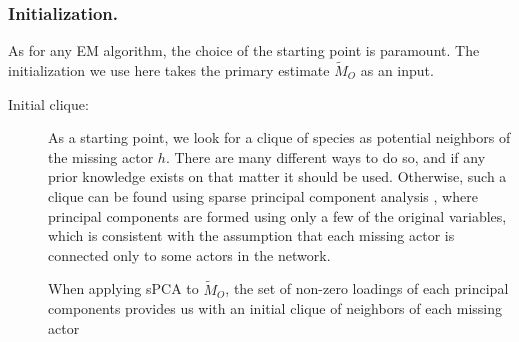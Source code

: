 \subsubsection*{Initialization.}
\label{init}
As for any EM algorithm, the choice of the starting point is paramount. The initialization we use here takes the primary estimate $\widetilde{M}_O$ as an input.
\begin{description}
\item [Initial clique:]
As a starting point, we look for a clique of species as potential neighbors of the missing actor $h$. There are many different ways to do so, and if any prior knowledge exists on that matter it should be used. Otherwise, such a clique can be found using sparse principal component analysis \citep[sPCA;][]{spca}, where principal components are formed using only a few of the original variables, which is consistent with the assumption that each missing actor is connected only to some actors in the network. 

When applying sPCA to $\widetilde{M}_O$, the set of non-zero loadings of each principal components provides us with an initial clique of neighbors of each missing actor


\end{description}
